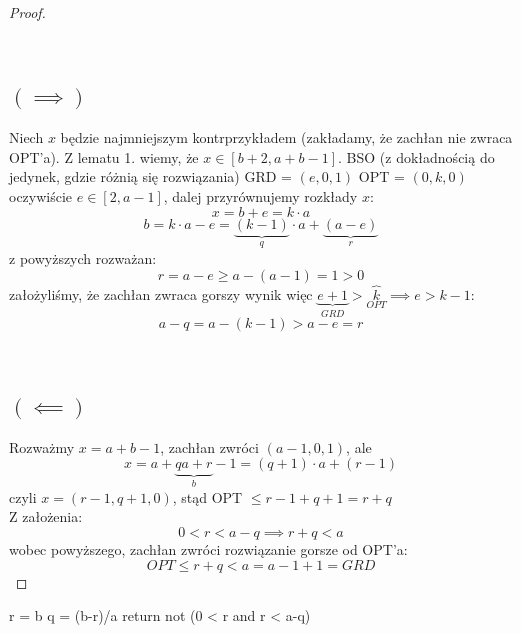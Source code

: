 \documentclass{article}
\begin{document}
\begin{proof}
\subsection*{\\$(\implies)$}
Niech $x$ będzie najmniejszym kontrprzykładem (zakładamy, że zachłan nie zwraca OPT'a). Z lematu 1. wiemy, że $x \in [b+2, a+b-1]$. BSO (z dokładnością do jedynek, gdzie różnią się rozwiązania) GRD = $(e,0,1)$ OPT = $(0,k,0)$ \\oczywiście $e \in [2, a-1]$, dalej przyrównujemy rozkłady $x$:
$$
x = b + e = k\cdot a
$$
$$
b = k\cdot a - e = \underbrace{(k-1)}_q\cdot a + \underbrace{(a-e)}_r
$$
z powyższych rozważan:
$$
r = a - e \geq a - (a-1) =1 > 0
$$
założyliśmy, że zachłan zwraca gorszy wynik więc $\underbrace{e + 1}_{GRD} > \overbrace{k}_{OPT} \implies e > k-1$:
$$
a - q = a - (k-1) > a - e = r
$$


\subsection*{\\$(\impliedby)$}
Rozważmy $x=a+b-1$, zachłan zwróci $(a-1,0,1)$, ale $$x = a + \underbrace{qa + r}_b - 1 =(q+1)\cdot a + (r-1)$$ czyli $x = (r-1,q+1,0)$, stąd OPT $\leq r-1 + q+1 = r+q$\\Z założenia:
$$
0 < r < a - q \implies r + q < a
$$
wobec powyższego, zachłan zwróci rozwiązanie gorsze od OPT'a:
$$
OPT \leq r + q < a = a - 1 + 1 = GRD
$$
\end{proof}
\begin{python}
r = b%
q = (b-r)/a
return not (0 < r and r < a-q)
\end{python}
\clearpage
\setcounter{lemma}{0}
\end{document}
